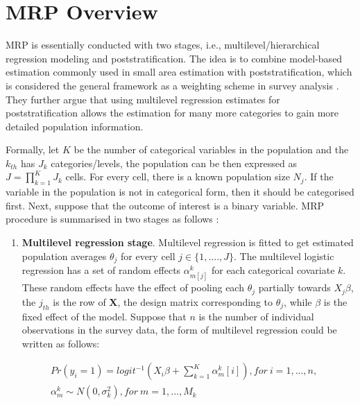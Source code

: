 \documentclass{monashthesis}
\begin{document}
\hypertarget{overview}{%
\section{MRP Overview}\label{overview}}

MRP is essentially conducted with two stages, i.e., multilevel/hierarchical regression modeling and poststratification. The idea is to combine model-based estimation commonly used in small area estimation with poststratification, which is considered the general framework as a weighting scheme in survey analysis \autocite{Gelman97poststratificationinto}. They further argue that using multilevel regression estimates for poststratification allows the estimation for many more categories to gain more detailed population information.

Formally, let \(K\) be the number of categorical variables in the population and the \(k_{th}\) has \(J_k\) categories/levels, the population can be then expressed as \(J = \prod_{k=1}^K J_k\) cells. For every cell, there is a known population size \(N_j\). If the variable in the population is not in categorical form, then it should be categorised first. Next, suppose that the outcome of interest is a binary variable. MRP procedure is summarised in two stages as follows \autocite{GaoYuxiang2021IMRa}:

\begin{enumerate}
\def\labelenumi{\arabic{enumi}.}
\tightlist
\item
  \textbf{Multilevel regression stage}. Multilevel regression is fitted to get estimated population averages \(\theta_j\) for every cell \(j \in \{1, ...., J\}\). The multilevel logistic regression has a set of random effects \(\alpha^k_{m[j]}\) for each categorical covariate \(k\). These random effects have the effect of pooling each \(\theta_j\) partially towards \(X_j\beta\), the \(j_{th}\) is the row of \(\textbf{X}\), the design matrix corresponding to \(\theta_j\), while \(\beta\) is the fixed effect of the model. Suppose that \(n\) is the number of individual observations in the survey data, the form of multilevel regression could be written as follows:
\end{enumerate}

\begin{equation} 
\begin{split}
& Pr(y_i = 1) = logit^{-1}\left(X_i\beta + \sum^K_{k=1}\alpha^k_m[i]\right), for\ i=1, ..., n,\\
& \alpha^k_m \sim N(0, \sigma^2_k), for\ m = 1, ..., M_k
\end{split}
\label{eq:mrp-stage1}
\end{equation}
\end{document}
